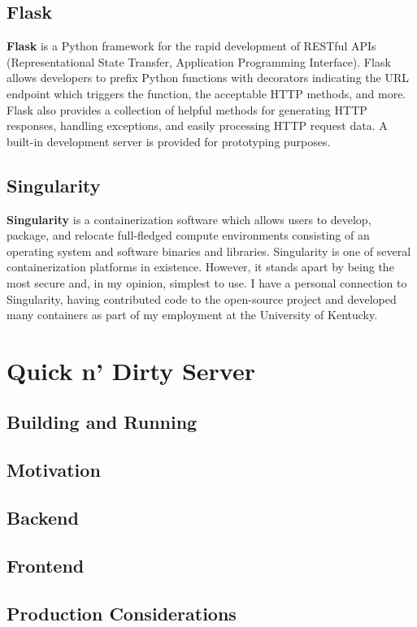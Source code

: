 \documentclass[12pt]{report}
\begin{document}
    \section{Flask}

\textbf{Flask} \cite{flask} is a Python framework for the rapid development of
RESTful APIs (Representational State Transfer, Application Programming
Interface). Flask allows developers to prefix Python functions with decorators
indicating the URL endpoint which triggers the function, the acceptable HTTP
methods, and more. Flask also provides a collection of helpful methods for
generating HTTP responses, handling exceptions, and easily processing HTTP
request data. A built-in development server is provided for prototyping
purposes.
    
    \section{Singularity}

\textbf{Singularity} \cite{singularity} is a containerization software which
allows users to develop, package, and relocate full-fledged compute environments
consisting of an operating system and software binaries and libraries.
Singularity is one of several containerization platforms in existence. However,
it stands apart by being the most secure and, in my opinion, simplest to use. I
have a personal connection to Singularity, having contributed code to the
open-source project and developed many containers as part of my employment at
the University of Kentucky.

\chapter{Quick n' Dirty Server}
    \section{Building and Running}
    \section{Motivation}
    \section{Backend}
    \section{Frontend}
    \section{Production Considerations}
\end{document}
